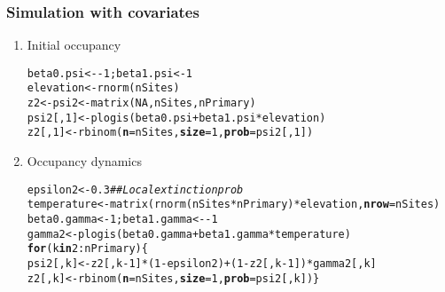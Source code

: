 \documentclass[color=usenames,dvipsnames]{beamer}\usepackage[]{graphicx}\usepackage[]{color}
\makeatletter
\newcommand{\hlnum}[1]{\textcolor[rgb]{0.69,0.494,0}{#1}}%
\newcommand{\hlcom}[1]{\textcolor[rgb]{0.514,0.506,0.514}{\textit{#1}}}%
\newcommand{\hlopt}[1]{\textcolor[rgb]{0,0,0}{#1}}%
\newcommand{\hlstd}[1]{\textcolor[rgb]{0,0,0}{#1}}%
\newcommand{\hlkwa}[1]{\textcolor[rgb]{0,0,0}{\textbf{#1}}}%
\newcommand{\hlkwb}[1]{\textcolor[rgb]{0,0.341,0.682}{#1}}%
\newcommand{\hlkwc}[1]{\textcolor[rgb]{0,0,0}{\textbf{#1}}}%
\newcommand{\hlkwd}[1]{\textcolor[rgb]{0.004,0.004,0.506}{#1}}%
\newenvironment{kframe}{%
 \def\at@end@of@kframe{}%
 \ifinner\ifhmode%
  \def\at@end@of@kframe{\end{minipage}}%
  \begin{minipage}{\columnwidth}%
 \fi\fi%
 \def\FrameCommand##1{\hskip\@totalleftmargin \hskip-\fboxsep
 \colorbox{shadecolor}{##1}\hskip-\fboxsep
     \hskip-\linewidth \hskip-\@totalleftmargin \hskip\columnwidth}%
 \MakeFramed {\advance\hsize-\width
   \@totalleftmargin\z@ \linewidth\hsize
   \@setminipage}}%
 {\par\unskip\endMakeFramed%
 \at@end@of@kframe}
\newenvironment{knitrout}{}{} %
\makeatother
\begin{document}
\begin{frame}[fragile]
  \frametitle{Simulation with covariates}
  \small
  \vfill
  \begin{enumerate}[<+->]
    \small
  \item Initial occupancy
\begin{knitrout}\tiny
{}\color{fgcolor}\begin{kframe}
\begin{alltt}
\hlstd{beta0.psi} \hlkwb{<-} \hlopt{-}\hlnum{1}\hlstd{; beta1.psi} \hlkwb{<-} \hlnum{1}
\hlstd{elevation} \hlkwb{<-} \hlkwd{rnorm}\hlstd{(nSites)}
\hlstd{z2} \hlkwb{<-} \hlstd{psi2} \hlkwb{<-} \hlkwd{matrix}\hlstd{(}\hlnum{NA}\hlstd{, nSites, nPrimary)}
\hlstd{psi2[,}\hlnum{1}\hlstd{]} \hlkwb{<-} \hlkwd{plogis}\hlstd{(beta0.psi} \hlopt{+} \hlstd{beta1.psi}\hlopt{*}\hlstd{elevation)}
\hlstd{z2[,}\hlnum{1}\hlstd{]} \hlkwb{<-} \hlkwd{rbinom}\hlstd{(}\hlkwc{n}\hlstd{=nSites,} \hlkwc{size}\hlstd{=}\hlnum{1}\hlstd{,} \hlkwc{prob}\hlstd{=psi2[,}\hlnum{1}\hlstd{])}
\end{alltt}
\end{kframe}
\end{knitrout}
  \item Occupancy dynamics
\begin{knitrout}\scriptsize
{}\color{fgcolor}\begin{kframe}
\begin{alltt}
\hlstd{epsilon2} \hlkwb{<-} \hlnum{0.3} \hlcom{## Local extinction prob}
\hlstd{temperature} \hlkwb{<-} \hlkwd{matrix}\hlstd{(}\hlkwd{rnorm}\hlstd{(nSites}\hlopt{*}\hlstd{nPrimary)}\hlopt{*}\hlstd{elevation,} \hlkwc{nrow}\hlstd{=nSites)}
\hlstd{beta0.gamma} \hlkwb{<-} \hlnum{1}\hlstd{; beta1.gamma} \hlkwb{<-} \hlopt{-}\hlnum{1}
\hlstd{gamma2} \hlkwb{<-} \hlkwd{plogis}\hlstd{(beta0.gamma} \hlopt{+} \hlstd{beta1.gamma}\hlopt{*}\hlstd{temperature)}
\hlkwa{for}\hlstd{(k} \hlkwa{in} \hlnum{2}\hlopt{:}\hlstd{nPrimary) \{}
    \hlstd{psi2[,k]} \hlkwb{<-} \hlstd{z2[,k}\hlopt{-}\hlnum{1}\hlstd{]}\hlopt{*}\hlstd{(}\hlnum{1}\hlopt{-}\hlstd{epsilon2)} \hlopt{+} \hlstd{(}\hlnum{1}\hlopt{-}\hlstd{z2[,k}\hlopt{-}\hlnum{1}\hlstd{])}\hlopt{*}\hlstd{gamma2[,k]}
    \hlstd{z2[,k]} \hlkwb{<-} \hlkwd{rbinom}\hlstd{(}\hlkwc{n}\hlstd{=nSites,} \hlkwc{size}\hlstd{=}\hlnum{1}\hlstd{,} \hlkwc{prob}\hlstd{=psi2[,k])    \}}
\end{alltt}
\end{kframe}
\end{knitrout}

\end{enumerate}
\end{frame}
\end{document}
